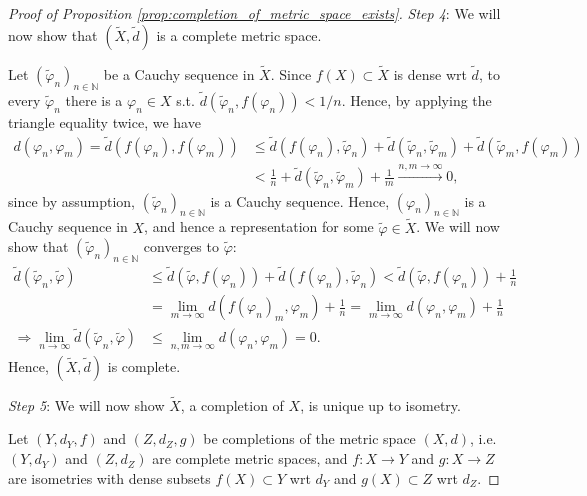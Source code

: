 \documentclass[12pt, a4paper]{article}
\numberwithin{equation}{section}
\theoremstyle{definition}
\theoremstyle{definition}
\newcommand{\seq}[1][\varphi]{\left( #1 \right)_{n \in \mathbb{N}}}
\begin{document}
\begin{proof}[Proof of Proposition \ref{prop:completion_of_metric_space_exists}]
		\textit{Step 4}: We will now show that $\left(\tilde{X}, \tilde{d}\right)$ is a complete metric space.
		
		Let $\seq[\tilde{\varphi}_n]$ be a Cauchy sequence in $\tilde{X}$. Since $f(X)\subset \tilde{X}$ is dense wrt $\tilde{d}$, to every $\tilde{\varphi}_n$ there is a $\varphi_n\in X$ s.t. $\tilde{d}\left(\tilde{\varphi}_n, f(\varphi_n)\right) < 1/n$. Hence, by applying the triangle equality twice, we have
		\begin{align}
			d(\varphi_n, \varphi_m) = \tilde{d}\left(f(\varphi_n), f(\varphi_m)\right) &\leq \tilde{d}\left(f(\varphi_n), \tilde{\varphi}_n\right) + \tilde{d}\left(\tilde{\varphi}_{n}, \tilde{\varphi}_m\right) + \tilde{d}\left(\tilde{\varphi}_m, f(\varphi_m)\right)
			\\ &< \frac{1}{n} + \tilde{d}\left(\tilde{\varphi}_n, \tilde{\varphi}_m\right) + \frac{1}{m} \overset{n, m\to\infty}{\longrightarrow} 0,
		\end{align}
		since by assumption, $\seq[\tilde{\varphi}_n]$ is a Cauchy sequence. Hence, $\seq[\varphi_n]$ is a Cauchy sequence in $X$, and hence a representation for some $\tilde{\varphi}\in\tilde{X}$. We will now show that $\seq[\tilde{\varphi}_n]$ converges to $\tilde{\varphi}$:
		\begin{align}
			\tilde{d}\left(\tilde{\varphi}_n, \tilde{\varphi}\right) &\leq \tilde{d}\left(\tilde{\varphi}, f(\varphi_n)\right) + \tilde{d}\left( f(\varphi_n), \tilde{\varphi}_n \right) < \tilde{d}\left(\tilde{\varphi}, f(\varphi_n)\right) + \frac{1}{n} 
			\\  &= \lim\limits_{m\to\infty} d\left(f(\varphi_n)_m, \varphi_m\right) + \frac{1}{n} = \lim\limits_{m\to\infty} d\left(\varphi_n, \varphi_m\right) + \frac{1}{n} 
			\\ \Rightarrow \lim\limits_{n\to\infty}\tilde{d}\left(\tilde{\varphi}_n, \tilde{\varphi}\right) &\leq \lim\limits_{n, m\to\infty} d(\varphi_n, \varphi_m) = 0.
		\end{align}
		Hence, $\left(\tilde{X}, \tilde{d}\right)$ is complete.
		
		\textit{Step 5}: We will now show $\tilde{X}$, a completion of $X$, is unique up to isometry.
		
		Let $(Y, d_Y, f)$ and $(Z, d_Z, g)$ be completions of the metric space $(X, d)$, i.e. $(Y, d_Y)$ and $(Z, d_Z)$ are complete metric spaces, and $f: X\to Y$ and $g: X\to Z$ are isometries with dense subsets $f(X)\subset Y$ wrt $d_Y$ and $g(X)\subset Z$ wrt $d_Z$.
		

\end{proof}
\end{document}
